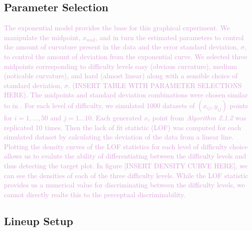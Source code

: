 \documentclass[]{interact}
\theoremstyle{plain}%
\theoremstyle{definition}
\theoremstyle{remark}
\begin{document}
\hypertarget{parameter-selection}{%
\subsection{Parameter Selection}\label{parameter-selection}}

\textcolor{Plum}{
The exponential model provides the base for this graphical experiment. 
We manipulate the midpoint, $x_{mid}$, and in turn the estimated parameters to control the amount of curvature present in the data and the error standard deviation, $\sigma$, to control the amount of deviation from the exponential curve.
We selected three midpoints corresponding to difficulty levels easy (obvious curvature), medium (noticable curvature), and hard (almost linear) along with a sensible choice of standard deviation, $\sigma.$ (INSERT TABLE WITH PARAMETER SELECTIONS HERE). 
The midpoints and standard deviation combinations were chosen similar to in \cite{vanderplas_clusters_2017}. 
For each level of difficulty, we simulated 1000 datasets of $(x_{ij}, y_{ij})$ points for $i = 1,...,50$ and $j = 1...10$. 
Each generated $x_i$ point from \textit{Algorithm 2.1.2} was replicated 10 times.  
Then the lack of fit statistic (LOF) was computed for each simulated dataset by calculating the deviation of the data from a linear line. 
Plotting the density curves of the LOF statistics for each level of difficulty choice allows us to evalute the ability of differentiating between the difficulty levels and thus detecting the target plot.
In figure [INSERT DENSITY CURVE HERE], we can see the densities of each of the three difficulty levels. 
While the LOF statistic provides us a numerical value for discriminating between the difficulty levels, we cannot directly realte this to the perceptual discriminability. 
}

\hypertarget{lineup-setup}{%
\subsection{Lineup Setup}\label{lineup-setup}}
\end{document}
